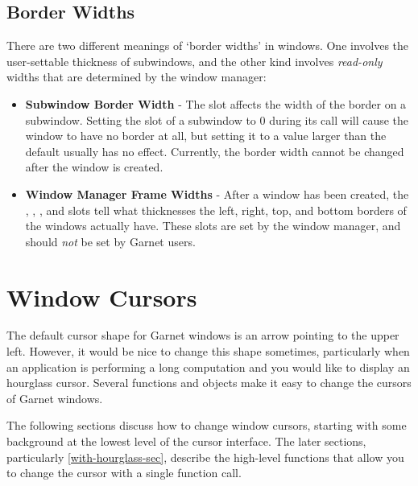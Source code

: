 \begin{group}
\section{Border Widths}
\label{border-widths}

There are two different meanings of `border widths' in windows.  One involves
the user-settable thickness of subwindows, and the other kind involves
{\it read-only} widths that are determined by the window manager:

\begin{itemize}
\item {}
{\bf Subwindow Border Width} - The  slot affects the width
of the border on a subwindow.
Setting the  slot of a subwindow to 0 during its
 call will cause the window to have no border at all,
but setting it to a value larger than the default usually has no effect.
Currently, the border width cannot be changed after the window is created.

\item {}
{\bf Window Manager Frame Widths} - After a window has been created, the
, ,
, and
 slots tell what thicknesses the left, right, top,
and bottom borders of the windows actually have.  These slots are set
by the window manager, and should {\it not} be set by Garnet users.
\end{itemize}
\end{group}


\section{Window Cursors}
\label{window-cursors}
  

The default cursor shape for Garnet windows is an arrow pointing to the
upper left.  However, it would be nice to change this shape sometimes,
particularly when an application is performing a long computation and you
would like to display an hourglass cursor.  Several functions and objects
make it easy to change the cursors of Garnet windows.

The following sections discuss how to change window cursors, starting with
some background at the lowest level of the cursor interface.  The later
sections, particularly \ref{with-hourglass-sec}, describe the high-level
functions that allow you to change the cursor with a single function call.


